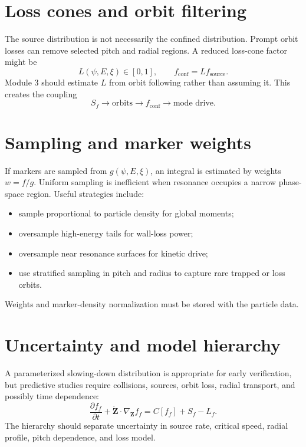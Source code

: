 \documentclass[11pt]{article}
\begin{document}
\section{Loss cones and orbit filtering}
The source distribution is not necessarily the confined distribution. Prompt orbit losses can remove selected pitch and radial regions. A reduced loss-cone factor might be
\begin{equation}
L(\psi,E,\xi)\in[0,1],
\qquad
f_{\mathrm{conf}}=L f_{\mathrm{source}}.
\end{equation}
Module 3 should estimate $L$ from orbit following rather than assuming it. This creates the coupling
\begin{equation}
S_f\longrightarrow\text{orbits}\longrightarrow f_{\mathrm{conf}}
\longrightarrow\text{mode drive}.
\end{equation}

\section{Sampling and marker weights}
If markers are sampled from $g(\psi,E,\xi)$, an integral is estimated by weights $w=f/g$. Uniform sampling is inefficient when resonance occupies a narrow phase-space region. Useful strategies include:
\begin{itemize}[leftmargin=1.6em]
\item sample proportional to particle density for global moments;
\item oversample high-energy tails for wall-loss power;
\item oversample near resonance surfaces for kinetic drive;
\item use stratified sampling in pitch and radius to capture rare trapped or loss orbits.
\end{itemize}
Weights and marker-density normalization must be stored with the particle data.

\section{Uncertainty and model hierarchy}
A parameterized slowing-down distribution is appropriate for early verification, but predictive studies require collisions, sources, orbit loss, radial transport, and possibly time dependence:
\begin{equation}
\frac{\partial f_f}{\partial t}
+\dot{\mathbf Z}\cdot\nabla_{\mathbf Z}f_f
=C[f_f]+S_f-L_f.
\end{equation}
The hierarchy should separate uncertainty in source rate, critical speed, radial profile, pitch dependence, and loss model.
\end{document}
